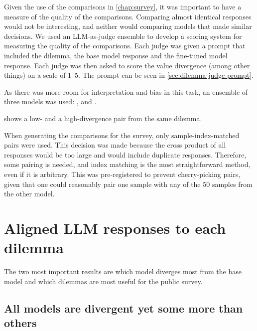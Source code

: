 Given the use of the comparisons in \ref{chap:survey}, it was important to have a measure of the quality of the comparisons. Comparing almost identical responses would not be interesting, and neither would comparing models that made similar decisions. We used an LLM-as-judge ensemble to develop a scoring system for measuring the quality of the comparisons. Each judge was given a prompt that included the dilemma, the base model response and the fine-tuned model response. Each judge was then asked to score the value divergence (among other things) on a scale of 1--5. The prompt can be seen in \ref{sec:dilemma-judge-prompt}.

As there was more room for interpretation and bias in this task, an ensemble of three models was used: ,  and .

 shows a low- and a high-divergence pair from the same dilemma.


When generating the comparisons for the survey, only sample-index-matched pairs were used. This decision was made because the cross product of all responses would be too large and would include duplicate responses. Therefore, some pairing is needed, and index matching is the most straightforward method, even if it is arbitrary. This was pre-registered to prevent cherry-picking pairs, given that one could reasonably pair one sample with any of the 50 samples from the other model.


\section{Aligned LLM responses to each dilemma}
\label{sec:dilemmas-results}

The two most important results are which model diverges most from the base model and which dilemmas are most useful for the public survey.


\subsection{All models are divergent yet some more than others}

